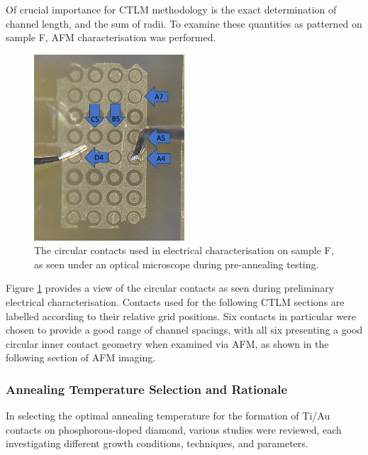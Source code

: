 \begin{refsection}
Of crucial importance for CTLM methodology is the exact determination of channel length, and the sum of radii. To examine these quantities as patterned on sample F, AFM characterisation was performed.

\begin{figure}[H]
    \centering
    \includegraphics[width=0.5\textwidth]{Chapter3/Figs/Raster/111 062022 CTLM labelled1.png}
    \caption{The circular contacts used in electrical characterisation on sample F, as seen under an optical microscope during pre-annealing testing.}
    \label{fig:sampleF_labelled}
\end{figure}

Figure \ref{fig:sampleF_labelled} provides a view of the circular contacts as seen during preliminary electrical characterisation. Contacts used for the following CTLM sections are labelled according to their relative grid positions. Six contacts in particular were chosen to provide a good range of channel spacings, with all six presenting a good circular inner contact geometry when examined via AFM, as shown in the following section of AFM imaging.

\subsubsection{Annealing Temperature Selection and Rationale}
\label{subsubsec:annealing_rationale}
In selecting the optimal annealing temperature for the formation of Ti/Au contacts on phosphorous-doped diamond, various studies were reviewed, each investigating different growth conditions, techniques, and parameters.


\end{refsection}
